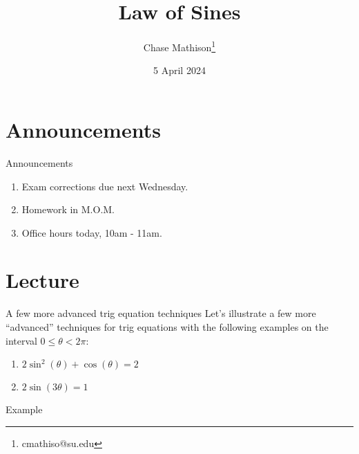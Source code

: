 \documentclass[presentation]{beamer}
\institute[SU]{Shenandoah University}
\author{Chase Mathison\thanks{cmathiso@su.edu}}
\date{5 April 2024}
\title{Law of Sines}
\begin{document}
\maketitle
\section{Announcements}
\label{sec:org3acf525}
\begin{frame}[label={sec:orgfa74445}]{Announcements}
\begin{enumerate}
\item Exam corrections due next Wednesday.
\item Homework in M.O.M.
\item Office hours today, 10am - 11am.
\end{enumerate}
\end{frame}

\section{Lecture}
\label{sec:org8cf8467}
\begin{frame}[label={sec:orgb390eeb}]{A few more advanced trig equation techniques}
Let's illustrate a few more ``advanced'' techniques for trig equations with the following examples on the interval \(0 \le \theta < 2\pi\):
\begin{enumerate}
\item \(2\sin^2(\theta) + \cos(\theta) = 2\)
\item \(2\sin(3\theta) = 1\)
\end{enumerate}

\vspace{10in}
\end{frame}

\begin{frame}[label={sec:org8b62a86}]{Example}
\end{frame}
\end{document}
